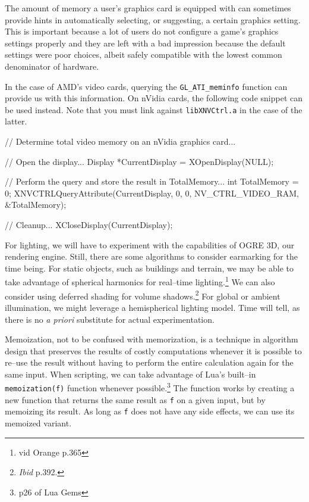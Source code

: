 The amount of memory a user's graphics card is equipped with can sometimes provide hints in automatically selecting, or suggesting, a certain graphics setting. This is important because a lot of users do not configure a game's graphics settings properly and they are left with a bad impression because the default settings were poor choices, albeit safely compatible with the lowest common denominator of hardware.

In the case of AMD's video cards, querying the {\tt GL_ATI_meminfo} function can provide us with this information. On nVidia cards, the following code snippet can be used instead. Note that you must link against {\tt libXNVCtrl.a} in the case of the latter.

\startCodeExample
// Determine total video memory on an nVidia graphics card...

    // Open the display...
    Display *CurrentDisplay = XOpenDisplay(NULL);

    // Perform the query and store the result in TotalMemory...
    int TotalMemory = 0;
    XNVCTRLQueryAttribute(CurrentDisplay, 0, 0, NV_CTRL_VIDEO_RAM, &TotalMemory);
    
    // Cleanup...
    XCloseDisplay(CurrentDisplay);
\stopCodeExample

For lighting, we will have to experiment with the capabilities of OGRE 3D, our rendering engine. Still, there are some algorithms to consider earmarking for the time being. For static objects, such as buildings and terrain, we may be able to take advantage of spherical harmonics for real--time lighting.\footnote{vid Orange p.365} We can also consider using deferred shading for volume shadows.\footnote{{\it Ibid} p.392.} For global or ambient illumination, we might leverage a hemispherical lighting model. Time will tell, as there is no {\it a priori} substitute for actual experimentation.

Memoization, not to be confused with memorization, is a technique in algorithm design that preserves the results of costly computations whenever it is possible to re--use the result without having to perform the entire calculation again for the same input. When scripting, we can take advantage of Lua's built--in {\tt memoization(f)} function whenever possible.\footnote{p26 of Lua Gems} The function works by creating a new function that returns the same result as {\tt f} on a given input, but by memoizing its result. As long as {\tt f} does not have any side effects, we can use its memoized variant.

